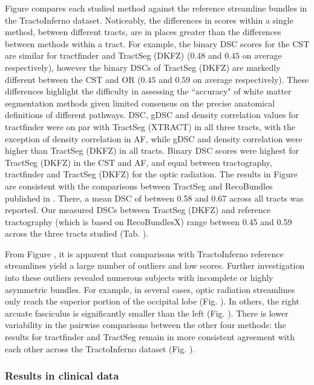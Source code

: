 Figure  compares each studied method against the reference streamline bundles in the TractoInferno dataset.
Noticeably, the differences in scores within a single method, between different tracts, are in places greater than the differences between methods within a tract.
For example, the binary DSC scores for the CST are similar for tractfinder and TractSeg (DKFZ) ($0.48$ and $0.45$ on average respectively), however the binary DSCs of TractSeg (DKFZ) are markedly different between the CST and OR ($0.45$ and $0.59$ on average respectively).
These differences highlight the difficulty in assessing the ``accuracy" of white matter segmentation methods given limited consensus on the precise anatomical definitions of different pathways.
DSC, gDSC and density correlation values for tractfinder were on par with TractSeg (XTRACT) in all three tracts, with the exception of density correlation in AF, while gDSC and density correlation were higher than TractSeg (DKFZ) in all tracts.
Binary DSC scores were highest for TractSeg (DKFZ) in the CST and AF, and equal between tractography, tractfinder and TractSeg (DKFZ)  for the optic radiation.
The results in Figure  are consistent with the comparisons between TractSeg and RecoBundles published in \textcite{Wasserthal2018}.
There, a mean DSC of between 0.58 and 0.67 across all tracts was reported.
Our measured DSCs between TractSeg (DKFZ) and reference tractography (which is based on RecoBundlesX\autocite{Garyfallidis2018}) range between 0.45 and 0.59 across the three tracts studied (Tab. ).

From Figure , it is apparent that comparisons with TractoInferno reference streamlines yield a large number of outliers and low scores.
Further investigation into these outliers revealed numerous subjects with incomplete or highly asymmetric bundles.
For example, in several cases, optic radiation streamlines only reach the superior portion of the occipital lobe (Fig. ).
In others, the right arcuate fasciculus is significantly smaller than the left (Fig. ).
There is lower variability in the pairwise comparisons between the other four methods: the results for tractfinder and TractSeg remain in more consistent agreement with each other across the TractoInferno dataset (Fig. ).

\subsubsection{Results in clinical data}

